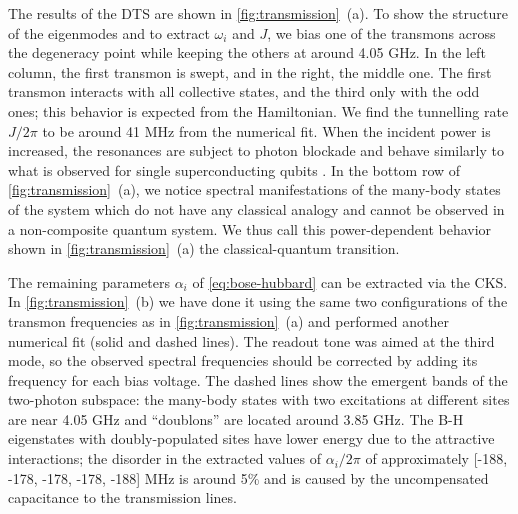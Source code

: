 \documentclass[%
 aps, prl,
 amsmath,amssymb,
 reprint,%
superscriptaddress
]{revtex4-2}
\begin{document}
The results of the DTS are shown in \autoref{fig:transmission}~(a). To show the structure of the eigenmodes and to extract $\omega_i$ and $J$, we bias one of the transmons across the degeneracy point while keeping the others at around 4.05 GHz. In the left column, the first transmon is swept, and in the right, the middle one. The first transmon interacts with all collective states, and the third only with the odd ones; this behavior is expected from the Hamiltonian. We find the tunnelling rate $J/2\pi$ to be around 41 MHz from the numerical fit. When the incident power is increased, the resonances are subject to photon blockade \cite{birnbaum2005photon} and behave similarly to what is observed for single superconducting qubits \cite{astafiev2010resonance}. In the bottom row of \autoref{fig:transmission}~(a), we notice spectral manifestations of the many-body states of the system which do not have any classical analogy and cannot be observed in a non-composite quantum system. We thus call this power-dependent behavior shown in \autoref{fig:transmission}~(a) the classical-quantum transition. 


The remaining parameters $\alpha_i$ of \autoref{eq:bose-hubbard} can be extracted via the CKS. In \autoref{fig:transmission}~(b) we have done it using the same two configurations of the transmon frequencies as in \autoref{fig:transmission}~(a) and performed another numerical fit (solid and dashed lines). The readout tone was aimed at the third mode, so the observed spectral frequencies should be corrected by adding its frequency for each bias voltage. The dashed lines show the emergent bands of the two-photon subspace: the many-body states with two excitations at different sites are near 4.05 GHz and ``doublons'' \cite{gorlach2018simulation} are located around 3.85 GHz. The B-H eigenstates with doubly-populated sites have lower energy due to the attractive interactions; the disorder in the extracted values of $\alpha_i/2\pi$ of approximately [-188, -178, -178, -178, -188] MHz is around 5\% and is caused by the uncompensated capacitance to the transmission lines. 
\end{document}
